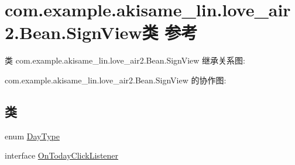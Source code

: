 \hypertarget{classcom_1_1example_1_1akisame__lin_1_1love__air2_1_1_bean_1_1_sign_view}{}\section{com.\+example.\+akisame\+\_\+lin.\+love\+\_\+air2.\+Bean.\+Sign\+View类 参考}
\label{classcom_1_1example_1_1akisame__lin_1_1love__air2_1_1_bean_1_1_sign_view}


类 com.\+example.\+akisame\+\_\+lin.\+love\+\_\+air2.\+Bean.\+Sign\+View 继承关系图\+:


com.\+example.\+akisame\+\_\+lin.\+love\+\_\+air2.\+Bean.\+Sign\+View 的协作图\+:
\subsection*{类}
\begin{DoxyCompactItemize}
\item 
enum \mbox{\hyperlink{enumcom_1_1example_1_1akisame__lin_1_1love__air2_1_1_bean_1_1_sign_view_1_1_day_type}{Day\+Type}}
\item 
interface \mbox{\hyperlink{interfacecom_1_1example_1_1akisame__lin_1_1love__air2_1_1_bean_1_1_sign_view_1_1_on_today_click_listener}{On\+Today\+Click\+Listener}}
\end{DoxyCompactItemize}
